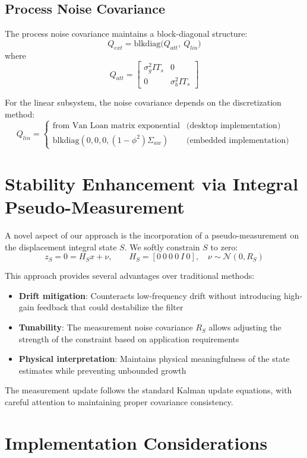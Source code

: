 \documentclass[11pt,letterpaper]{article}
\begin{document}
\subsection{Process Noise Covariance}

The process noise covariance maintains a block-diagonal structure:
\[
Q_{ext} = \mathrm{blkdiag}\big(Q_{att},\ Q_{lin}\big)
\]
where
\[
Q_{att}=\begin{bmatrix}
\sigma_g^2 I T_s & 0 \\ 0 & \sigma_b^2 I T_s
\end{bmatrix}
\]

For the linear subsystem, the noise covariance depends on the discretization method:
\[
Q_{lin}=\begin{cases}
\text{from Van Loan matrix exponential} & \text{(desktop implementation)} \\
\mathrm{blkdiag}(0,0,0,(1-\phi^2)\Sigma_{aw}) & \text{(embedded implementation)}
\end{cases}
\]

\section{Stability Enhancement via Integral Pseudo-Measurement}
\label{sec:integral_pseudo_measurement}

A novel aspect of our approach is the incorporation of a pseudo-measurement on the displacement integral state $S$. We softly constrain $S$ to zero:
\[
z_S = 0 = H_S x + \nu,\qquad
H_S=[0\ 0\ 0\ 0\ I\ 0],\quad \nu\sim\mathcal{N}(0,R_S)
\]

This approach provides several advantages over traditional methods:
\begin{itemize}
\item \textbf{Drift mitigation}: Counteracts low-frequency drift without introducing high-gain feedback that could destabilize the filter
\item \textbf{Tunability}: The measurement noise covariance $R_S$ allows adjusting the strength of the constraint based on application requirements
\item \textbf{Physical interpretation}: Maintains physical meaningfulness of the state estimates while preventing unbounded growth
\end{itemize}

The measurement update follows the standard Kalman update equations, with careful attention to maintaining proper covariance consistency.

\section{Implementation Considerations}
\label{sec:implementation}
\end{document}
